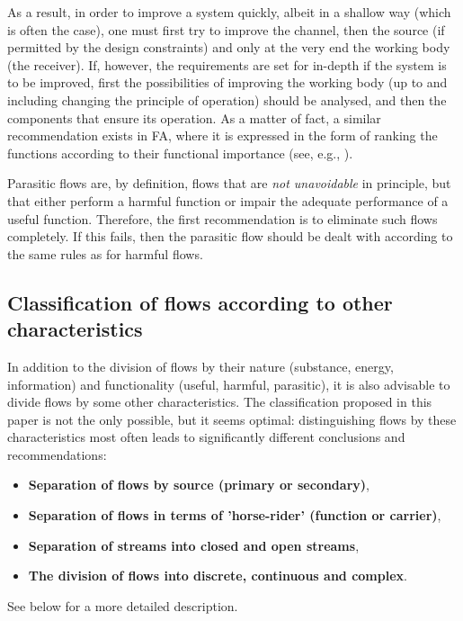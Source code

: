\documentclass[a4paper,11pt]{article}
\begin{document}
As a result, in order to improve a system quickly, albeit in a shallow way
(which is often the case), one must first try to improve the channel, then the
source (if permitted by the design constraints) and only at the very end the
working body (the receiver). If, however, the requirements are set for
in-depth if the system is to be improved, first the possibilities of improving
the working body (up to and including changing the principle of operation)
should be analysed, and then the components that ensure its operation. As a
matter of fact, a similar recommendation exists in FA, where it is expressed
in the form of ranking the functions according to their functional importance
(see, e.g., \cite{B16}).

Parasitic flows are, by definition, flows that are \emph{not unavoidable} in
principle, but that either perform a harmful function or impair the adequate
performance of a useful function. Therefore, the first recommendation is to
eliminate such flows completely. If this fails, then the parasitic flow should
be dealt with according to the same rules as for harmful flows.

\subsection{Classification of flows according to other characteristics}

In addition to the division of flows by their nature (substance, energy,
information) and functionality (useful, harmful, parasitic), it is also
advisable to divide flows by some other characteristics. The classification
proposed in this paper is not the only possible, but it seems optimal:
distinguishing flows by these characteristics most often leads to
significantly different conclusions and recommendations:
\begin{itemize}
\item \textbf{Separation of flows by source (primary or secondary)},
\item \textbf{Separation of flows in terms of 'horse-rider' (function or
  carrier)},
\item \textbf{Separation of streams into closed and open streams},
\item \textbf{The division of flows into discrete, continuous and complex}.
\end{itemize}
See below for a more detailed description.
\end{document}
